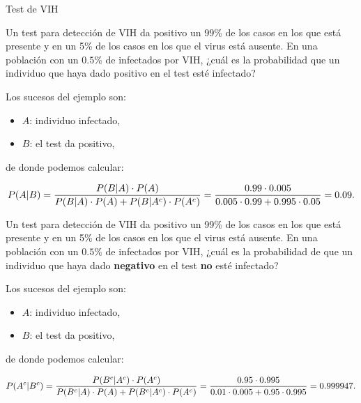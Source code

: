 \documentclass[
  letterpaper,
  DIV=11,
  numbers=noendperiod]{scrreprt}
\providecommand{\tightlist}{%
  \setlength{\itemsep}{0pt}\setlength{\parskip}{0pt}}\usepackage{longtable,booktabs,array}
\begin{document}
\begin{Ejemplo}{Test de VIH}{}

Un test para detección de VIH da positivo un 99\% de los casos en los
que está presente y en un 5\% de los casos en los que el virus está
ausente. En una población con un \(0.5\%\) de infectados por VIH, ¿cuál
es la probabilidad que un individuo que haya dado positivo en el test
esté infectado?

Los sucesos del ejemplo son:

\begin{itemize}
\tightlist
\item
  \(A\): individuo infectado,
\item
  \(B\): el test da positivo,
\end{itemize}

de donde podemos calcular:

\[\scriptsize{
P(A|B) =\dfrac{P(B|A)\cdot P(A)}{P(B|A)\cdot P(A)+P(B|A^c)\cdot P(A^c)}=\dfrac{0.99\cdot 0.005}{0.005\cdot 0.99+0.995\cdot 0.05}=0.09.}
\]

Un test para detección de VIH da positivo un 99\% de los casos en los
que está presente y en un 5\% de los casos en los que el virus está
ausente. En una población con un \(0.5\%\) de infectados por VIH, ¿cuál
es la probabilidad de que un individuo que haya dado \textbf{negativo}
en el test \textbf{no} esté infectado?

Los sucesos del ejemplo son:

\begin{itemize}
\tightlist
\item
  \(A\): individuo infectado,
\item
  \(B\): el test da positivo,
\end{itemize}

de donde podemos calcular:

\[
\scriptsize{P(A^c|B^c) =\dfrac{P(B^c|A^c)\cdot P(A^c)}{P(B^c|A)\cdot P(A)+P(B^c|A^c)\cdot P(A^c)}=\dfrac{0.95\cdot 0.995}{0.01\cdot 0.005+0.95\cdot 0.995}=0.999947.}
\]

\end{Ejemplo}
\end{document}
